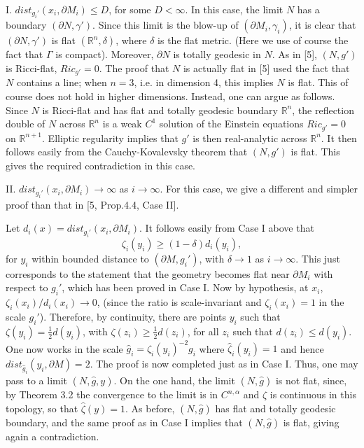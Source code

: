 \documentclass[11pt,amsfonts]{amsart}
\begin{document}
 I. $dist_{g_{i}'}(x_{i}, \partial M_{i}) \leq D$, for some $D <  
\infty$. In this case, the limit $N$ has a boundary $(\partial N, 
\gamma')$. Since this limit is the blow-up of $(\partial M_{i}, \gamma_{i})$, 
it is clear that $(\partial N, \gamma')$ is flat $({\mathbb R}^{n}, 
\delta)$, where $\delta$ is the flat metric. (Here we use of course 
the fact that $\Gamma$ is compact). Moreover, $\partial N$ is totally 
geodesic in $N$. As in [5], $(N, g')$ is Ricci-flat, $Ric_{g'} = 0$. 
The proof that $N$ is actually flat in [5] used the fact that $N$ contains 
a line; when $n = 3$, i.e. in dimension 4, this implies $N$ is flat. This 
of course does not hold in higher dimensions. Instead, one can argue as 
follows. Since $N$ is Ricci-flat and has flat and totally geodesic boundary 
${\mathbb R}^{n}$, the reflection double of $N$ across ${\mathbb R}^{n}$ is a 
weak $C^{1}$ solution of the Einstein equations $Ric_{g'} = 0$ on 
${\mathbb R}^{n+1}$. Elliptic regularity implies that $g'$ is then real-analytic 
across ${\mathbb R}^{n}$. It then follows easily from the Cauchy-Kovalevsky 
theorem that $(N, g')$ is flat. This gives the required contradiction in this case. 

 II. $dist_{g_{i}'}(x_{i}, \partial M_{i}) \rightarrow \infty$ as $i 
\rightarrow  \infty$. For this case, we give a different and simpler 
proof than that in [5, Prop.4.4, Case II]. 

 Let $d_{i}(x) = dist_{g_{i}'}(x_{i}, \partial M_{i})$. It follows 
easily from Case I above that
$$\zeta_{i}(y_{i}) \geq  (1-\delta )d_{i}(y_{i}),  $$
for $y_{i}$ within bounded distance to $(\partial M, g_{i}')$, with 
$\delta \rightarrow 1$ as $i \rightarrow \infty$. This just 
corresponds to the statement that the geometry becomes flat near 
$\partial M_{i}$ with respect to $g_{i}'$, which has been proved in 
Case I. Now by hypothesis, at $x_{i}$, $\zeta_{i}(x_{i})/d_{i}(x_{i}) 
\rightarrow 0$, (since the ratio is scale-invariant and 
$\zeta_{i}(x_{i}) = 1$ in the scale $g_{i}'$). Therefore, by continuity, 
there are points $y_{i}$ such that $\zeta (y_{i}) = \frac{1}{2}d(y_{i})$, 
with $\zeta (z_{i}) \geq  \frac{1}{2}d(z_{i})$, for all $z_{i}$ such that 
$d(z_{i}) \leq  d(y_{i})$. One now works in the scale $\hat g_{i} = 
\zeta_{i}(y_{i})^{-2}g_{i}$ where $\hat \zeta_{i}(y_{i}) = 1$ and hence 
$dist_{\hat g_{i}}(y_{i}, \partial M) = 2$. The proof is now completed just 
as in Case I. Thus, one may pass to a limit $(N, \hat g, y)$. On the one 
hand, the limit $(N, \hat g)$ is not flat, since, by Theorem 3.2 the 
convergence to the limit is in $C^{n,\alpha}$ and $\zeta$ is continuous 
in this topology, so that $\hat \zeta(y) = 1$. As before, $(N, \hat g)$ has 
flat and totally geodesic boundary, and the same proof as in Case I implies 
that $(N, \hat g)$ is flat, giving again a contradiction. 
\end{document}
